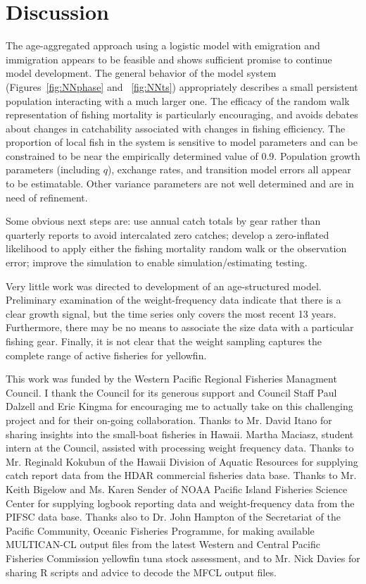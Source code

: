 \documentclass[12pt,letterpaper,twoside]{article}
\begin{document}
\section{Discussion}

The age-aggregated approach using a logistic model with emigration and
immigration appears to be feasible and shows sufficient promise to
continue model development.
The general behavior of the model system (Figures~\ref{fig:NNphase} and
~\ref{fig:NNts}) appropriately describes a small persistent population
interacting with a much larger one.
The efficacy of the random walk
representation of fishing mortality is particularly encouraging, and
avoids debates about changes in catchability associated with
changes in fishing efficiency.
The proportion of local fish in the system is sensitive to model
parameters and can be constrained to be near the empirically
determined value of 0.9.
Population growth parameters (including $q$),  exchange rates,
and transition model errors all appear to be estimatable. 
Other variance parameters are not well determined and are in need of
refinement.

Some obvious next steps are: 
use annual catch totals by gear rather than quarterly reports to avoid
intercalated zero catches;
develop a zero-inflated likelihood to apply either the fishing
mortality random walk or the observation error;
improve the simulation to enable simulation/estimating testing.

Very little work was directed to development of an age-structured
model.
Preliminary examination of the weight-frequency data indicate that
there is a clear growth signal, but the time series only covers
the most recent 13 years. Furthermore, there may be no means to associate the
size data with a particular fishing gear. Finally, it is not clear
that the weight sampling captures the complete range of active
fisheries for yellowfin.

\clearpage
This work was funded by the Western Pacific Regional Fisheries
Managment Council. I thank the Council for its generous support and
Council Staff Paul Dalzell and Eric Kingma for encouraging me to
actually take on this challenging project and for their on-going
collaboration.
Thanks to Mr. David Itano for sharing insights into the small-boat
fisheries in Hawaii.
Martha Maciasz, student intern at the Council, assisted with
processing weight frequency data.
Thanks to Mr. Reginald Kokubun of the Hawaii Division of Aquatic
Resources for supplying catch report data from the HDAR commercial
fisheries data base.
Thanks to Mr. Keith Bigelow and Ms. Karen Sender of NOAA Pacific
Island Fisheries Science Center for supplying logbook reporting data and
weight-frequency data from the PIFSC data base.
Thanks also to Dr. John Hampton of the Secretariat of the Pacific
Community, Oceanic Fisheries Programme, for making available
MULTICAN-CL output files from the latest Western and Central Pacific
Fisheries Commission yellowfin tuna stock assessment, and to Mr. Nick
Davies for sharing R scripts and advice to decode the MFCL output files.
\end{document}
